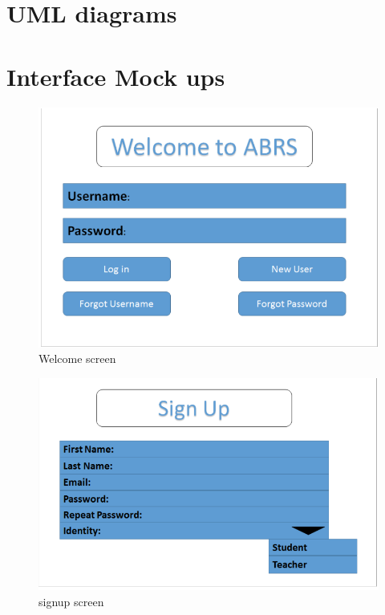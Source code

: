 \documentclass[12pt]{article}
\begin{document}
\section{UML diagrams}
\pagebreak
\section{Interface Mock ups}

\begin{figure}[h]
	\caption{Welcome screen}
\includegraphics[width=\textwidth]{img/3} 
\end{figure}
\begin{figure}[h]
	\caption{signup screen}
\includegraphics[width=\textwidth]{img/4} 
\end{figure}
\end{document}
